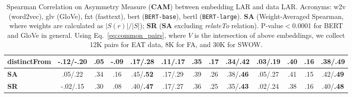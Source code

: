 \documentclass[letterpaper]{article} %
\begin{document}
\begin{table}
\begin{tabular}{@{}l|cccc|cccc|cccc@{}}
distinctFrom&-.12/-.20&.05&-.09&.17/\textbf{.28} &.11/.17&.35&.17&.34/\textbf{.42}&.03/.19& .40&.16&.38/\textbf{.49}\\
\hline
\textbf{SA} & .05/.22 & .34 & .16 & .45/\textbf{.52} & .17/.29 &.39 & .26 & .38/\textbf{.46} & .05/.27 & .41 & .15 & .42/\textbf{.49}\\
\hline
\textbf{SR} & -.02/.15 & .30 & .08 & .40/\textbf{.47} & .17/.27 & .36 & .25 & .35/\textbf{.43} & .02/.24 & .38 & .16 & .40/\textbf{.48} \\

\end{tabular}
\caption{Spearman Correlation on Asymmetry Measure (\textbf{CAM}) between embedding LAR and data LAR. Acronyms: w2v (word2vec), glv (GloVe), fxt (fasttext), bert (\texttt{BERT-base}), bertl (\texttt{BERT-large}).
\textbf{SA} (Weight-Averaged Spearman, where weights are calculated as $|S(r)|/|S|$); \textbf{SR} (\textbf{SA} excluding \textit{relateTo} relation). P-value$<$0.0001 for BERT and GloVe in general. Using Eq.~\ref{eq:common_pairs}, where $V$ is the intersection of above embeddings, we collect 12K pairs for EAT data, 8K for FA, and 30K for SWOW.
}

\label{tab:2}
\end{table}
\end{document}
